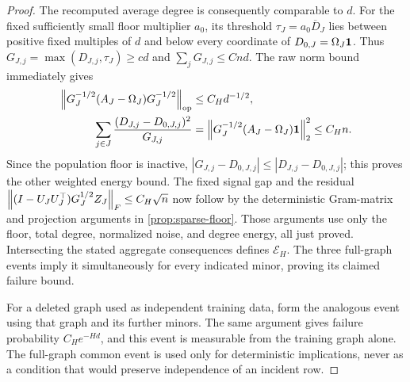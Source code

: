 \begin{proof}
The recomputed average degree is consequently comparable to $d$.
For the fixed sufficiently small floor multiplier $a_0$, its threshold
$\tau_J=a_0\overline D_J$ lies between positive fixed multiples of
$d$ and below every coordinate of $D_{0,J}=\Omega_J\mathbf 1$.
Thus $G_{J,j}=\max(D_{J,j},\tau_J)\ge cd$ and
$\sum_jG_{J,j}\le Cnd$. The raw norm bound immediately gives
\begin{align*}
 \left\lVert G_J^{-1/2}(A_J-\Omega_J)G_J^{-1/2}\right\rVert_{\mathrm{op}}
   &\le C_Hd^{-1/2},\\
 \sum_{j\in J}\frac{(D_{J,j}-D_{0,J,j})^2}{G_{J,j}}
   &=\left\lVert G_J^{-1/2}(A_J-\Omega_J)\mathbf 1\right\rVert_2^2
     \le C_Hn.
\end{align*}
Since the population floor is inactive,
$|G_{J,j}-D_{0,J,j}|\le|D_{J,j}-D_{0,J,j}|$; this proves the
other weighted energy bound. The fixed signal gap and the residual
$\left\lVert(I-U_JU_J^\top)G_J^{1/2}Z_J\right\rVert_F\le C_H\sqrt n$
now follow by the deterministic Gram-matrix and projection arguments
in \cref{prop:sparse-floor}. Those arguments use only the floor,
total degree, normalized noise, and degree energy, all just proved.
Intersecting the stated aggregate consequences defines
$\mathcal E_H$. The three full-graph events imply it simultaneously
for every indicated minor, proving its claimed failure bound.

For a deleted graph used as independent training data, form the
analogous event using that graph and its further minors. The same
argument gives failure probability $C_He^{-Hd}$, and this event is
measurable from the training graph alone. The full-graph common event
is used only for deterministic implications, never as a condition
that would preserve independence of an incident row.
\end{proof}

